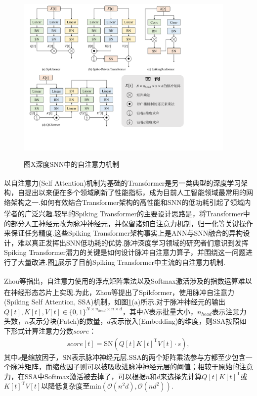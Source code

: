\documentclass[10.5pt,compsoc,UTF8]{CjC}
\theoremstyle{mystyle}
\newcommand{\upcite}[1]{\textsuperscript{\cite{#1}}}
\begin{document}
\begin{multicols}{1}
\begin{figure}[H]
	\centerline{\includegraphics[width=0.95\textwidth]{./data/attention.pdf}}
	{图X\quad 深度SNN中的自注意力机制}
	\label{fig: self attention}
\end{figure}

以自注意力(Self Attention)机制为基础的Transformer\upcite{vaswani2017attention}是另一类典型的深度学习架构，自提出以来便在多个领域刷新了性能指标，成为目前人工智能领域最常用的网络架构之一.如何有效结合Transformer架构的高性能和SNN的低功耗引起了领域内学者的广泛兴趣.较早的Spiking Transformer\upcite{zhang2022spiking,zhang2022spike,han2023complex}的主要设计思路是，将Transformer中的部分人工神经元改为脉冲神经元，并保留诸如自注意力机制，归一化等关键操作来保证任务精度.这些Spiking Transformer架构事实上是ANN与SNN融合的异构设计，难以真正发挥出SNN低功耗的优势.脉冲深度学习领域的研究者们意识到发挥Spiking Transformer潜力的关键是如何设计脉冲自注意力算子，并围绕这一问题进行了大量改进.图\ref{fig: self attention}展示了目前Spiking Transformer中主流的自注意力机制.

Zhou等\upcite{zhou2023spikformer}指出，自注意力使用的浮点矩阵乘法以及Softmax激活涉及的指数运算难以在神经形态芯片上实现.为此，Zhou等\upcite{zhou2023spikformer}提出了Spikformer，使用脉冲自注意力(Spiking Self Attention, SSA)机制，如图\ref{fig: self attention}(a)所示.对于脉冲神经元的输出$Q[t], K[t], V[t] \in \{0, 1\}^{N \times n_{head} \times n \times d}$，其中$N$表示批量大小，$n_{head}$表示注意力头数，$n$表示分块(Patch)的数量，$d$表示嵌入(Embedding)的维度，则SSA按照如下形式计算注意力分数$score$：
\begin{eqnarray}
	score[t] = \text{SN}(Q[t]K[t]^{\mathrm{T}}V[t] \cdot s), 
\end{eqnarray}
其中$s$是缩放因子，$\text{SN}$表示脉冲神经元层.SSA的两个矩阵乘法参与方都至少包含一个脉冲矩阵，而缩放因子则可以被吸收进脉冲神经元层的阈值；相较于原始的注意力，在SSA中Softmax激活被去掉了，可以根据$n$和$d$来选择先计算$Q[t]K[t]^{\mathrm{T}}$或$K[t]^{\mathrm{T}}V[t]$以降低复杂度至$\text{min}(\mathcal{O}(n^{2}d), \mathcal{O}(nd^{2}))$.


\end{multicols}
\end{document}
